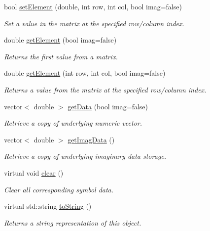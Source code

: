 \begin{DoxyCompactItemize}
bool \hyperlink{class_g_e_matrix_a0f9910054bf5faf4074784a5ce1ba4bb}{set\-Element} (double, int row, int col, bool imag=false)
\begin{DoxyCompactList}\small\item\em Set a value in the matrix at the specified row/column index. \end{DoxyCompactList}\item 
double \hyperlink{class_g_e_matrix_a37be9c3ae20e6adc9968e0770d71d42d}{get\-Element} (bool imag=false)
\begin{DoxyCompactList}\small\item\em Returns the first value from a matrix. \end{DoxyCompactList}\item 
double \hyperlink{class_g_e_matrix_ae74f09cd9e8dd209301646de6fc34766}{get\-Element} (int row, int col, bool imag=false)
\begin{DoxyCompactList}\small\item\em Returns a value from the matrix at the specified row/column index. \end{DoxyCompactList}\item 
vector$<$ double $>$ \hyperlink{class_g_e_matrix_af5e9d6f29599ab9344d4f7e163dd7d61}{get\-Data} (bool imag=false)
\begin{DoxyCompactList}\small\item\em Retrieve a copy of underlying numeric vector. \end{DoxyCompactList}\item 
vector$<$ double $>$ \hyperlink{class_g_e_matrix_a5bcef5af3933e59df30bfbc40d0d53ee}{get\-Imag\-Data} ()
\begin{DoxyCompactList}\small\item\em Retrieve a copy of underlying imaginary data storage. \end{DoxyCompactList}\item 
virtual void \hyperlink{class_g_e_matrix_a1bf6ddd9f46248e1c03c0d952d572103}{clear} ()
\begin{DoxyCompactList}\small\item\em Clear all corresponding symbol data. \end{DoxyCompactList}\item 
virtual std\-::string \hyperlink{class_g_e_matrix_a6f46cc050d3f8966a01676791b362387}{to\-String} ()
\begin{DoxyCompactList}\small\item\em Returns a string representation of this object. \end{DoxyCompactList}\end{DoxyCompactItemize}

